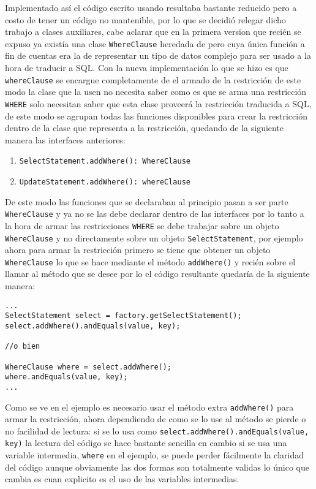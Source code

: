 Implementado así el código escrito usando \jj resultaba bastante reducido pero a costo de tener un código no mantenible, por lo que se decidió relegar dicho trabajo a clases auxiliares, cabe aclarar que en la primera version que recién se expuso ya existía una clase \verb=WhereClause= heredada de \cc pero cuya única función a fin de cuentas era la de representar un tipo de datos complejo para ser usado a la hora de traducir a SQL. Con la nueva implementación lo que se hizo es que \verb=whereClause= se encargue completamente de el armado de la restricción de este modo la clase que la usen no necesita saber como es que se arma una restricción \verb=WHERE= solo necesitan saber que esta clase proveerá la restricción traducida a SQL, de este modo se agrupan todas las funciones disponibles para crear la restricción dentro de la clase que representa a la restricción, quedando de la siguiente manera las interfaces anteriores:
%
\begin{enumerate}
\item \verb=SelectStatement.addWhere(): WhereClause=
\item \verb=UpdateStatement.addWhere(): whereClause=
\end{enumerate}
%
De este modo las funciones que se declaraban al principio pasan a ser parte \verb=WhereClause= y ya no se las debe declarar dentro de las interfaces por lo tanto a la hora de armar las restricciones \verb=WHERE= se debe trabajar sobre un objeto \verb=WhereClause= y no directamente sobre un objeto \verb=SelectStatement=, por ejemplo ahora para armar la restricción primero se tiene que obtener un objeto \verb=WhereClause= lo que se hace mediante el método \verb=addWhere()= y recién sobre el llamar al método que se desee por lo el código resultante quedaría de la siguiente manera:
\begin{lstlisting}[title=Nueva implementación para el uso de las clases auxiliares]
...
SelectStatement select = factory.getSelectStatement();
select.addWhere().andEquals(value, key);

//o bien

WhereClause where = select.addWhere();
where.andEquals(value, key);
...
\end{lstlisting}
Como se ve en el ejemplo es necesario usar el método extra \verb=addWhere()= para armar la restricción, ahora dependiendo de como se lo use al método se pierde o no facilidad de lectura:  si se lo usa como \verb=select.addWhere().andEquals(value, key)= la lectura del código se hace bastante sencilla en cambio si se usa una variable intermedia, \verb=where= en el ejemplo, se puede perder fácilmente la claridad del código aunque obviamente las dos formas son totalmente validas lo único que cambia es cuan explicito es el uso de las variables intermedias.

